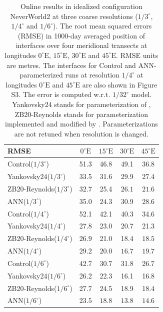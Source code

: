 \documentclass[draft,grl]{agutexSI2019}
\begin{document}
\begin{table}[]
	\begin{center}
		\begin{tabular}{l|cccc}
			       RMSE  & $0^{\circ}\mathrm{E}$  & $15^{\circ}\mathrm{E}$ & $30^{\circ}\mathrm{E}$ & $45^{\circ}\mathrm{E}$\\ 
            \hline 
            Control($1/3^{\circ}$)     	 &  51.3 &  46.8 & 49.1 & 
               36.8  \\
               Yankovsky24($1/3^{\circ}$)     	 &  33.5 & 31.6 & 29.9 &  27.4   \\
               ZB20-Reynolds($1/3^\circ$) & $\mathbf{32.7}$ &  25.4 &  $\mathbf{26.1}$ &  $\mathbf{21.6}$ \\
               ANN($1/3^\circ$)             &  35.0 &  $\mathbf{24.3}$ &  30.9 &  28.6 \\
            \hline
		    Control($1/4^{\circ}$)     	 &  52.1  & 42.1 & 40.3 & 34.6  \\
               Yankovsky24($1/4^{\circ}$)    &  27.8  & 23.0 & 20.7 & 21.3  \\
               ZB20-Reynolds($1/4^{\circ}$)  &  $\mathbf{26.9}$  & 21.0 & 18.4 & $\mathbf{18.5}$ \\
               ANN($1/4^{\circ}$)       & $29.2$ & $\mathbf{20.0}$ & $\mathbf{16.7}$ & $19.7$ \\
            \hline
            Control($1/6^\circ$) & 42.7 &  30.7 &  31.8 &  26.7  \\
            Yankovsky24($1/6^\circ$) & 26.2 & 22.3 & 16.1 & 16.8  \\
            ZB20-Reynolds($1/6^\circ$) &  27.7 &  24.5 & 18.9 & 18.4 \\
            ANN($1/6^\circ$) & $\mathbf{23.5}$ & $\mathbf{18.8}$ & $\mathbf{13.8}$ & $\mathbf{14.6}$ 
		\end{tabular}
		\caption{Online results in idealized configuration NeverWorld2 at three coarse resolutions ($1/3^\circ$, $1/4^\circ$ and $1/6^\circ$). The root mean squared errors (RMSE) in 1000-day averaged position of interfaces over four meridional transects at longitudes $0^{\circ}\mathrm{E}$, $15^{\circ}\mathrm{E}$, $30^{\circ}\mathrm{E}$ and $45^{\circ}\mathrm{E}$. RMSE units are metres. The interfaces for Control and  ANN-parameterized runs at resolution $1/4^\circ$ at longitudes $0^{\circ}\mathrm{E}$ and $45^{\circ}\mathrm{E}$ are also shown in Figure S3. The error is computed w.r.t. $1/32^{\circ}$ model. Yankovsky24 stands for parameterization of , ZB20-Reynolds stands for  parameterization implemented and modified by . Parameterizations are not retuned when resolution is changed.}
	\end{center}
\end{table}
\end{document}
